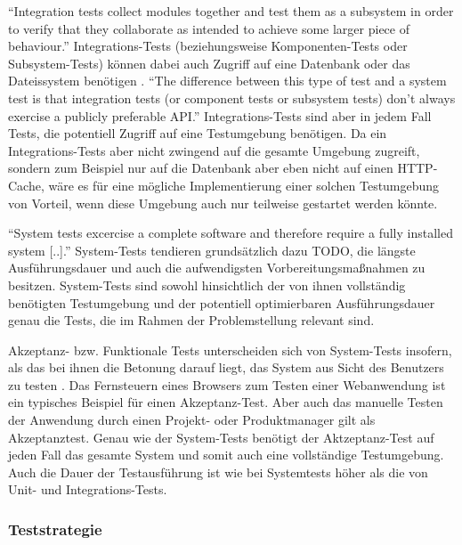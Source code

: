 
"`Integration tests collect modules together and test them as a subsystem in order to verify that they collaborate as intended to achieve some larger piece of behaviour."' \citep[S.][S. 10]{microservicetesting}Integrations-Tests (beziehungsweise Komponenten-Tests oder Subsystem-Tests) können dabei auch Zugriff auf eine Datenbank oder das Dateissystem benötigen \citep[Vgl.][S. 133]{DuvMatAnd07}. "`The difference between this type of test and a system test is that integration tests (or component tests or subsystem tests) don't always exercise a publicly preferable API."' \citep[S.][S. 136]{DuvMatAnd07} Integrations-Tests sind aber in jedem Fall Tests, die potentiell Zugriff auf eine Testumgebung benötigen. Da ein Integrations-Tests aber nicht zwingend auf die gesamte Umgebung zugreift, sondern zum Beispiel nur auf die Datenbank aber eben nicht auf einen HTTP-Cache, wäre es für eine mögliche Implementierung einer solchen Testumgebung von Vorteil, wenn diese Umgebung auch nur teilweise gestartet werden könnte.


"`System tests excercise a complete software and therefore require a fully installed system [..]."' \citep[S.][S. 136]{DuvMatAnd07} System-Tests tendieren grundsätzlich dazu TODO, die längste Ausführungsdauer und auch die aufwendigsten Vorbereitungsmaßnahmen zu besitzen. \citep[Vgl.][S. 136]{DuvMatAnd07} System-Tests sind sowohl hinsichtlich der von ihnen vollständig benötigten Testumgebung und der potentiell optimierbaren Ausführungsdauer genau die Tests, die im Rahmen der Problemstellung relevant sind.


Akzeptanz- bzw. Funktionale Tests unterscheiden sich von System-Tests insofern, als das bei ihnen die Betonung darauf liegt, das System aus Sicht des Benutzers zu testen \citep[Vgl.][S. 136]{DuvMatAnd07}. Das Fernsteuern eines Browsers zum Testen einer Webanwendung ist ein typisches Beispiel für einen Akzeptanz-Test. Aber auch das manuelle Testen der Anwendung durch einen Projekt- oder Produktmanager gilt als Akzeptanztest. Genau wie der System-Tests benötigt der Aktzeptanz-Test auf jeden Fall das gesamte System und somit auch eine vollständige Testumgebung. Auch die Dauer der Testausführung ist wie bei Systemtests höher als die von Unit- und Integrations-Tests.

\subsubsection{Teststrategie}

